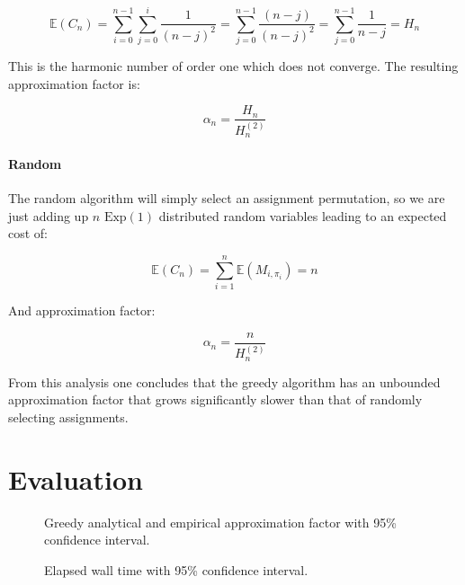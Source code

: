 \documentclass{article}
\newcommand{\expected}[1]{\mathbb{E} \left ( #1 \right )}
\newcommand{\exprv}[1]{\text{Exp} \left( #1 \right )}
\begin{document}
\begin{equation}
	\expected{C_n} = \sum_{i=0}^{n-1} \sum_{j=0}^{i} \frac{1}{(n - j)^2} = \sum_{j=0}^{n-1} \frac{(n-j)}{(n-j)^2} = \sum_{j=0}^{n-1} \frac{1}{n-j} = H_n
\end{equation}

This is the harmonic number of order one which does not converge. The resulting approximation factor is:

\begin{equation}
	\alpha_n = \frac{H_n}{H_n^{(2)}}
\end{equation}

\paragraph{Random}

The random algorithm will simply select an assignment permutation, so we are just adding up $n$ $\exprv{1}$ distributed random variables leading to an expected cost of: 

\begin{equation}
	\expected{C_n} = \sum_{i=1}^n \expected{ M_{i, \pi_i} } = n
\end{equation}

And approximation factor:

\begin{equation}
	\alpha_n = \frac{n}{H_n^{(2)}}
\end{equation}

From this analysis one concludes that the greedy algorithm has an unbounded approximation factor that grows significantly slower than that of randomly selecting assignments.

\newpage
\section{Evaluation}

\begin{multicols}{2}
\begin{figure}[H]
	\centering
	\resizebox{\linewidth}{!}{}
	\caption{Greedy analytical and empirical approximation factor with 95\% confidence interval.}
	\label{fig:approximationFactor}
\end{figure}

\columnbreak

\begin{figure}[H]
	\centering
	\resizebox{\linewidth}{!}{}
	\caption{Elapsed wall time with 95\% confidence interval.}
	\label{fig:runtime}
\end{figure}
\end{multicols}
\end{document}
